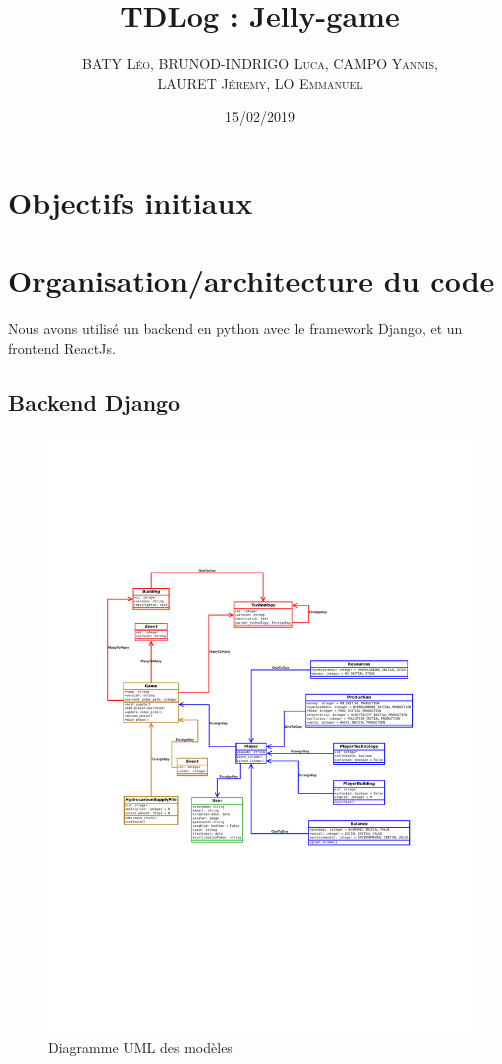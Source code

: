 \documentclass[12pt,twoside,a4paper]{article}
\title{TDLog : Jelly-game}
\author{\textsc{BATY L\'eo, BRUNOD-INDRIGO Luca, CAMPO Yannis,}\\ \textsc{LAURET J\'eremy, LO Emmanuel}}
\date{15/02/2019}
\begin{document}
\maketitle

\tableofcontents

\newpage%

\section{Objectifs initiaux}

\newpage%

\section{Organisation/architecture du code}

Nous avons utilis\'e un backend en python avec le framework Django, et un frontend ReactJs.

\subsection{Backend Django}

\begin{figure}[H]
\centering
\includegraphics[width=15cm]{../global_uml.pdf}
\caption{Diagramme UML des mod\`eles}
\end{figure}
\end{document}
